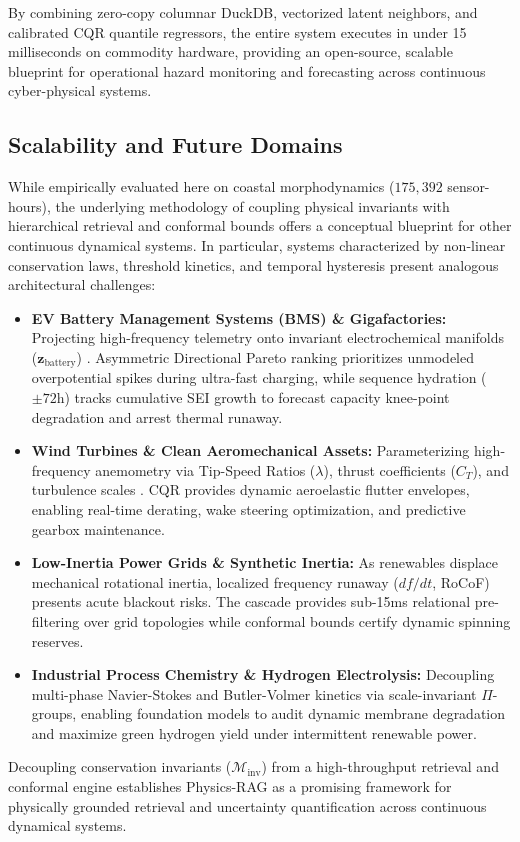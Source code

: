 \documentclass[journal]{IEEEtran}
\begin{document}
By combining zero-copy columnar DuckDB, vectorized latent neighbors, and calibrated CQR quantile regressors, the entire system executes in under 15 milliseconds on commodity hardware, providing an open-source, scalable blueprint for operational hazard monitoring and forecasting across continuous cyber-physical systems.

\subsection{Scalability and Future Domains}
\label{sec:scalability_future_domains}
While empirically evaluated here on coastal morphodynamics ($175{,}392$ sensor-hours), the underlying methodology of coupling physical invariants with hierarchical retrieval and conformal bounds offers a conceptual blueprint for other continuous dynamical systems. In particular, systems characterized by non-linear conservation laws, threshold kinetics, and temporal hysteresis present analogous architectural challenges:

\begin{itemize}
    \setlength{\itemsep}{0.5pt}\setlength{\parskip}{0pt}
    \item \textbf{EV Battery Management Systems (BMS) \& Gigafactories:} Projecting high-frequency telemetry onto invariant electrochemical manifolds ($\mathbf{z}_{\text{battery}}$) \cite{ramadesigan2012battery}. Asymmetric Directional Pareto ranking prioritizes unmodeled overpotential spikes during ultra-fast charging, while sequence hydration ($\pm 72\text{h}$) tracks cumulative SEI growth to forecast capacity knee-point degradation \cite{severson2019battery} and arrest thermal runaway.
    \item \textbf{Wind Turbines \& Clean Aeromechanical Assets:} Parameterizing high-frequency anemometry via Tip-Speed Ratios ($\lambda$), thrust coefficients ($C_T$), and turbulence scales \cite{porteagel2020wind}. CQR provides dynamic aeroelastic flutter envelopes, enabling real-time derating, wake steering optimization, and predictive gearbox maintenance.
    \item \textbf{Low-Inertia Power Grids \& Synthetic Inertia:} As renewables displace mechanical rotational inertia, localized frequency runaway ($df/dt$, RoCoF) presents acute blackout risks. The cascade provides sub-15ms relational pre-filtering over grid topologies while conformal bounds certify dynamic spinning reserves.
    \item \textbf{Industrial Process Chemistry \& Hydrogen Electrolysis:} Decoupling multi-phase Navier-Stokes and Butler-Volmer kinetics via scale-invariant $\Pi$-groups, enabling foundation models to audit dynamic membrane degradation and maximize green hydrogen yield under intermittent renewable power.
\end{itemize}
Decoupling conservation invariants ($\mathcal{M}_{\text{inv}}$) from a high-throughput retrieval and conformal engine establishes Physics-RAG as a promising framework for physically grounded retrieval and uncertainty quantification across continuous dynamical systems.
\end{document}
